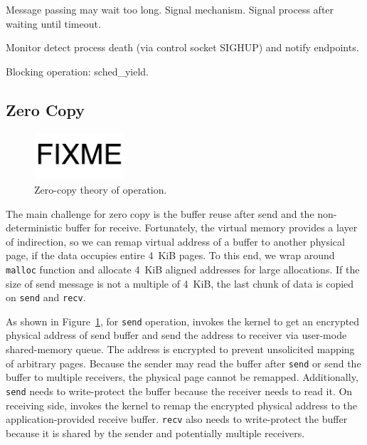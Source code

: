Message passing may wait too long.
Signal mechanism. Signal process after waiting until timeout.

Monitor detect process death (via control socket SIGHUP) and notify endpoints.

Blocking operation: sched\_yield.


\subsection{Zero Copy}
\label{subsec:zerocopy}

\begin{figure}[t]
	\centering
	\includegraphics[width=0.3\textwidth]{images/fixme}
	\caption{Zero-copy theory of operation.}
	\label{fig:zerocopy}
\end{figure}

The main challenge for zero copy is the buffer reuse after send and the non-deterministic buffer for receive.
Fortunately, the virtual memory provides a layer of indirection, so we can remap virtual address of a buffer to another physical page, if the data occupies entire 4~KiB pages.
To this end, we wrap around \texttt{malloc} function and allocate 4~KiB aligned addresses for large allocations.
If the size of send message is not a multiple of 4~KiB, the last chunk of data is copied on \texttt{send} and \texttt{recv}.

As shown in Figure~\ref{fig:zerocopy}, for \texttt{send} operation, \libipc{} invokes the kernel to get an encrypted physical address of send buffer and send the address to receiver via user-mode shared-memory queue.
The address is encrypted to prevent unsolicited mapping of arbitrary pages.
Because the sender may read the buffer after \texttt{send} or send the buffer to multiple receivers, the physical page cannot be remapped.
Additionally, \texttt{send} needs to write-protect the buffer because the receiver needs to read it.
On receiving side, \libipc{} invokes the kernel to remap the encrypted physical address to the application-provided receive buffer.
\texttt{recv} also needs to write-protect the buffer because it is shared by the sender and potentially multiple receivers.


